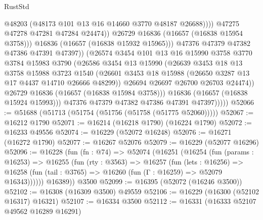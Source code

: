 \begin{lexlean}{RustStd}
\begin{coremodule}
                                  @48203
                                  (@48173 @101 @13 @16 @14660 @3770 @48187 @26688))))
                            @47275
                            @47278
                            @47281
                            @47284
                            @24474))
                        @26729
                        @16836
                        (@16657 (@16838 @15954 @3758)))
                      @16836
                      (@16657 (@16838 @15932 @15965)))
                    @47376
                    @47379
                    @47382
                    @47386
                    @47391
                    @47397))
                (@26574
                  @3454
                  @101
                  @13
                  @16
                  @15990
                  @3758
                  @3770
                  @3784
                  @15983
                  @3790
                  (@26586
                    @3454
                    @13
                    @15990
                    (@26639
                      @3453
                      @18
                      @13
                      @3758
                      @15988
                      @3723
                      @1540
                      (@26601 @3453 @18 @15988 (@26650 @3287 @13 @17 @4437 @14710 @26666 @48299))
                      @26694
                      @26697
                      @26700
                      @26703
                      @24474))
                  @26729
                  @16836
                  (@16657 (@16838 @15984 @3758)))
                @16836
                (@16657 (@16838 @15924 @15993)))
              @47376
              @47379
              @47382
              @47386
              @47391
              @47397)))))
@52066 := @51688 (@51713 (@51754 (@51756 (@51758 (@51775 @52060)))))
@52067 := @16212 @1790
@52071 := @16214 (@16218 @1790) (@16224 @1790)
@52072 := @16233 @49556
@52074 := @16229 (@52072 @16248)
@52076 := @16271 (@16272 @1790)
@52077 := @16267 @52076
@52079 := @16229 (@52077 @16296)
@52096 := @16228
    (fun (fn : @74) =>
    @52074
      (@16251
        (@16254
          (fun (params : @16253) =>
          @16255
            (fun (rty : @3563) =>
            @16257
              (fun (lets : @16256) =>
              @16258 (fun (tail : @3765) => @16260 (fun (Γ : @16259) => @52079 @16343))))))
        @16389))
    @3500
@52099 := @16395 (@52072 (@16246 @3500))
@52102 := @16308 (@16309 @3500) @49559
@52106 := @16229 (@16300 (@52102 @16317) @16321)
@52107 := @16334 @3500
@52112 := @16331 (@16333 @52107 @49562 @16289 @16291)

\end{coremodule}
\end{lexlean}
